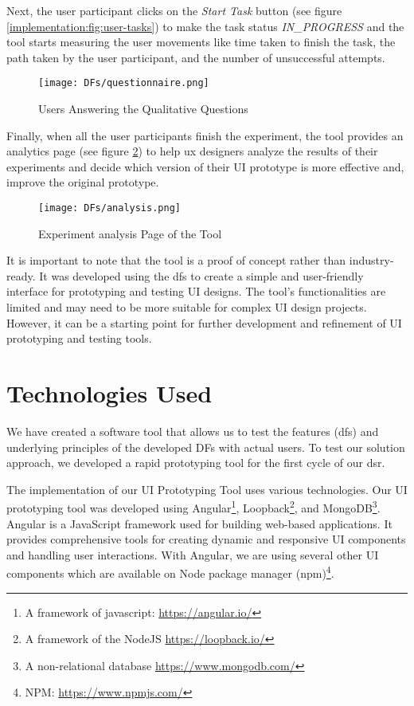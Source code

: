 Next, the user participant clicks on the \textit{Start Task} button (see figure \ref{implementation:fig:user-tasks}) to make the task status \textit{IN\_PROGRESS} and the tool starts measuring the user movements like time taken to finish the task, the path taken by the user participant, and the number of unsuccessful attempts.

\begin{figure}[ht]
    \centering
    \texttt{[image: DFs/questionnaire.png]}
    \caption{Users Answering the Qualitative Questions}
    \label{implementation:fig:user-qualitative}
\end{figure}

Finally, when all the user participants finish the experiment, the tool provides an analytics page (see figure \ref{implementation:fig:analysis}) to help \ac{ux} designers analyze the results of their experiments and decide which version of their UI prototype is more effective and, improve the original prototype. 
\begin{figure}[ht]
    \centering
    \texttt{[image: DFs/analysis.png]}
    \caption{Experiment analysis Page of the Tool}
    \label{implementation:fig:analysis}
\end{figure}

It is important to note that the tool is a proof of concept rather than industry-ready. 
It was developed using the \ac{df}s to create a simple and user-friendly interface for prototyping and testing UI designs. 
The tool's functionalities are limited and may need to be more suitable for complex UI design projects. 
However, it can be a starting point for further development and refinement of UI prototyping and testing tools.

\clearpage
\section{Technologies Used}
\label{implementation:section:technologies}
We have created a software tool that allows us to test the features (\ac{df}s) and underlying principles of the developed DFs with actual users.
To test our solution approach, we developed a rapid prototyping tool for the first cycle of our \ac{dsr}. 

The implementation of our UI Prototyping Tool uses various technologies.
Our UI prototyping tool was developed using Angular\footnote{A framework of javascript: \url{https://angular.io/}}, Loopback\footnote{A framework of the NodeJS \url{https://loopback.io/}}, and MongoDB\footnote{A non-relational database \url{https://www.mongodb.com/}}.
Angular is a JavaScript framework used for building web-based applications.
It provides comprehensive tools for creating dynamic and responsive UI components and handling user interactions.
With Angular, we are using several other UI components which are available on Node package manager (npm)\footnote{NPM: \url{https://www.npmjs.com/}}.

